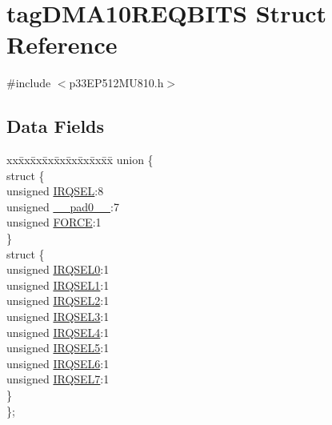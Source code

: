 \hypertarget{structtag_d_m_a10_r_e_q_b_i_t_s}{}\section{tag\+D\+M\+A10\+R\+E\+Q\+B\+I\+TS Struct Reference}
\label{structtag_d_m_a10_r_e_q_b_i_t_s}


{\ttfamily \#include $<$p33\+E\+P512\+M\+U810.\+h$>$}

\subsection*{Data Fields}
\begin{DoxyCompactItemize}
\item 
\begin{tabbing}
xx\=xx\=xx\=xx\=xx\=xx\=xx\=xx\=xx\=\kill
union \{\\
\>struct \{\\
\>\>unsigned \hyperlink{structtag_d_m_a10_r_e_q_b_i_t_s_a5e70ba01366ab2f37371d52661dd93b2}{IRQSEL}:8\\
\>\>unsigned \hyperlink{structtag_d_m_a10_r_e_q_b_i_t_s_adf71f3d8410c1f1dbbc96680a92c49af}{\_\_pad0\_\_}:7\\
\>\>unsigned \hyperlink{structtag_d_m_a10_r_e_q_b_i_t_s_a9b378a7ffc1ab4bc4a3710fb36389180}{FORCE}:1\\
\>\} \\
\>struct \{\\
\>\>unsigned \hyperlink{structtag_d_m_a10_r_e_q_b_i_t_s_ac73241b8f783760c9192dfd8a0773cad}{IRQSEL0}:1\\
\>\>unsigned \hyperlink{structtag_d_m_a10_r_e_q_b_i_t_s_a45e1f083e5a8a59f25acc35910732426}{IRQSEL1}:1\\
\>\>unsigned \hyperlink{structtag_d_m_a10_r_e_q_b_i_t_s_a60dda7474727b3624ca25fa0067a8924}{IRQSEL2}:1\\
\>\>unsigned \hyperlink{structtag_d_m_a10_r_e_q_b_i_t_s_aeaafe1b8c89398ed382054ab628aed78}{IRQSEL3}:1\\
\>\>unsigned \hyperlink{structtag_d_m_a10_r_e_q_b_i_t_s_a91c4162e0f3d4ac7adcdb49302f19840}{IRQSEL4}:1\\
\>\>unsigned \hyperlink{structtag_d_m_a10_r_e_q_b_i_t_s_a6382d50430464cf20b3dee3dbf2e8c01}{IRQSEL5}:1\\
\>\>unsigned \hyperlink{structtag_d_m_a10_r_e_q_b_i_t_s_ace52408ef8c29561f3c56a3fbcbc8217}{IRQSEL6}:1\\
\>\>unsigned \hyperlink{structtag_d_m_a10_r_e_q_b_i_t_s_acce7dedecdf1f53cdbead3edf7c5d53a}{IRQSEL7}:1\\
\>\} \\
\}; \\

\end{tabbing}\end{DoxyCompactItemize}


